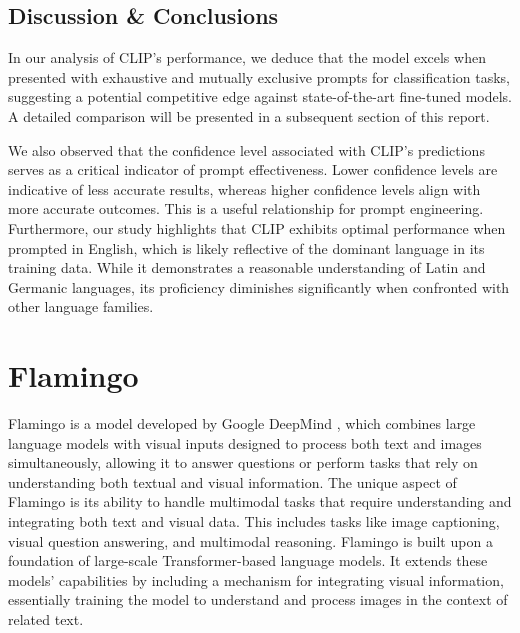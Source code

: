 


\subsection{Discussion \& Conclusions}
In our analysis of CLIP's performance, we deduce that the model excels when presented with exhaustive and mutually exclusive prompts for classification tasks, suggesting a potential competitive edge against state-of-the-art fine-tuned models. A detailed comparison will be presented in a subsequent section of this report.

We also observed that the confidence level associated with CLIP’s predictions serves as a critical indicator of prompt effectiveness. Lower confidence levels are indicative of less accurate results, whereas higher confidence levels align with more accurate outcomes. This is a useful relationship for prompt engineering. Furthermore, our study highlights that CLIP exhibits optimal performance when prompted in English, which is likely reflective of the dominant language in its training data. While it demonstrates a reasonable understanding of Latin and Germanic languages, its proficiency diminishes significantly when confronted with other language families. 


\section{Flamingo}

Flamingo is a model developed by Google DeepMind \parencite{alayrac2022flamingo}, which combines large language models with visual inputs designed to process both text and images simultaneously, allowing it to answer questions or perform tasks that rely on understanding both textual and visual information. The unique aspect of Flamingo is its ability to handle multimodal tasks that require understanding and integrating both text and visual data. This includes tasks like image captioning, visual question answering, and multimodal reasoning. Flamingo is built upon a foundation of large-scale Transformer-based language models. It extends these models' capabilities by including a mechanism for integrating visual information, essentially training the model to understand and process images in the context of related text.

